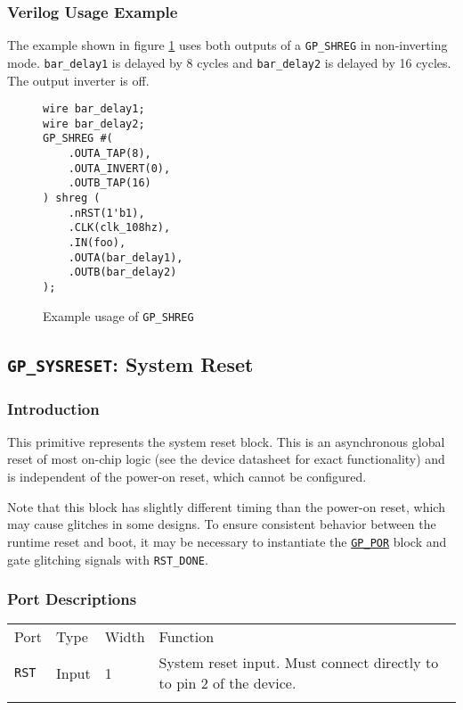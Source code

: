 \documentclass[11pt]{article}
\newcommand{\tokenstyle}[1]{\texttt{#1}}
\newcommand{\wirestyle}[1]{\texttt{#1}}
\newcommand{\whenstyle}[1]{{\fontseries{sb}\selectfont#1}}
\newcommand{\tokenref}[2]{\hyperref[#2]{\tokenstyle{#1}}}
\newcommand{\thinhline}{\Xhline{1\arrayrulewidth}}
\newcommand{\thickhline}{\Xhline{2.5\arrayrulewidth}}
\begin{document}
\subsubsection{Verilog Usage Example}

The example shown in figure \ref{gp-shreg-example} uses both outputs of a \tokenstyle{GP\_SHREG} in non-inverting mode.
\wirestyle{bar\_delay1} is delayed by 8 cycles and \wirestyle{bar\_delay2} is delayed by 16 cycles. The output inverter is off.

\begin{figure}[h]
\begin{lstlisting}
wire bar_delay1;
wire bar_delay2;
GP_SHREG #(
	.OUTA_TAP(8),
	.OUTA_INVERT(0),
	.OUTB_TAP(16)
) shreg (
	.nRST(1'b1),
	.CLK(clk_108hz),
	.IN(foo),
	.OUTA(bar_delay1),
	.OUTB(bar_delay2)
);
\end{lstlisting}
\caption{Example usage of \tokenstyle{GP\_SHREG}}
\label{gp-shreg-example}
\end{figure}


\pagebreak
\clearpage
\subsection{\tokenstyle{GP\_SYSRESET}: System Reset}
\label{gp-sysreset}

\subsubsection{Introduction}
This primitive represents the system reset block. This is an asynchronous global reset of most on-chip logic (see the
device datasheet for exact functionality) and is independent of the power-on reset, which cannot be configured.

Note that this block has slightly different timing than the power-on reset, which may cause glitches in some designs.
To ensure consistent behavior between the runtime reset and boot, it may be necessary to instantiate the
\tokenref{GP\_POR}{gp-por} block and gate glitching signals with \tokenstyle{RST\_DONE}.

\subsubsection{Port Descriptions}

\begin{tabularx}{\textwidth}{lllX}
\thinhline
\whenstyle{Port} & \whenstyle{Type} & \whenstyle{Width} & \whenstyle{Function} \\
\thickhline
\tokenstyle{RST} & Input & 1 & System reset input. Must connect directly to to pin 2 of the device.\\
\thinhline
\end{tabularx}
\end{document}
